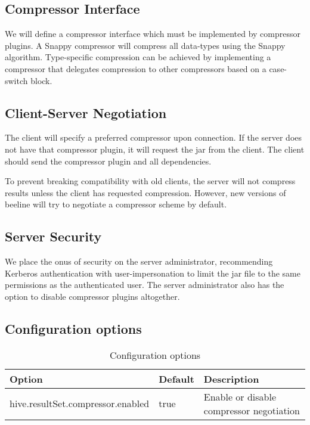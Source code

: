 \documentclass[11pt,a4paper]{article}
\begin{document}
	\subsection{Compressor Interface}
			We will define a compressor interface which must be implemented by compressor plugins.
			A Snappy compressor will compress all data-types using the Snappy algorithm.
			Type-specific compression can be achieved by implementing a compressor that delegates compression to other compressors based on a case-switch block.
		
		
	\subsection{Client-Server Negotiation}
		The client will specify a preferred compressor upon connection. 
		If the server does not have that compressor plugin, it will request the jar from the client. 
		The client should send the compressor plugin and all dependencies.
	
		To prevent breaking compatibility with old clients, the server will not compress results unless the client has requested compression.
		However, new versions of beeline will try to negotiate a compressor scheme by default.
	
	\subsection{Server Security}
		We place the onus of security on the server administrator, recommending Kerberos authentication with user-impersonation to limit the jar file to the same permissions as the authenticated user. 
		The server administrator also has the option to disable compressor plugins altogether.
		
		
	\subsection{Configuration options}
	\begin{table}[!h]
		\begin{tabular}{| l | l | p{4cm} |} \hline
			\textbf{Option} & \textbf{Default} & \textbf{Description} \\ \hline
			hive.resultSet.compressor.enabled & true & Enable or disable compressor negotiation \\ \hline
		\end{tabular}
		\caption{Configuration options}
	\end{table}
\end{document}
